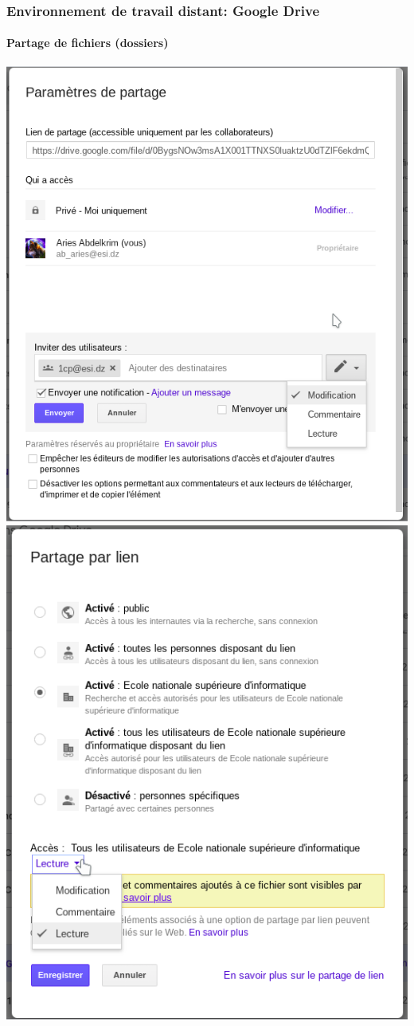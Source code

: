 \documentclass[xcolor=table]{beamer}
\begin{document}
\begin{frame}
\frametitle{Environnement de travail distant: Google Drive}
\framesubtitle{Partage de fichiers (dossiers)}

\begin{center}
	\includegraphics[width=
	.45\textwidth]{../img/Bweb01-environnement/drive-share1.png}
	\includegraphics[width=
	.45\textwidth]{../img/Bweb01-environnement/drive-share2.png}
\end{center}

\end{frame}

\end{document}
